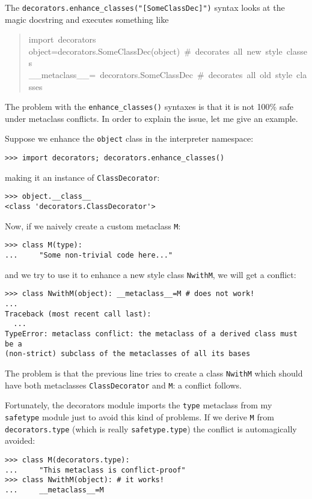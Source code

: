 \documentclass[11pt,english]{article}
\begin{document}
The \texttt{decorators.enhance{\_}classes("[SomeClassDec]")} syntax looks at the
magic docstring and executes something like
\begin{quote}
\begin{ttfamily}\begin{flushleft}
\mbox{import~decorators}\\
\mbox{object=decorators.SomeClassDec(object)~{\#}~decorates~all~new~style~classes}\\
\mbox{{\_}{\_}metaclass{\_}{\_}=~decorators.SomeClassDec~{\#}~decorates~all~old~style~classes}
\end{flushleft}\end{ttfamily}
\end{quote}

The problem with the \texttt{enhance{\_}classes()} syntaxes is that it is
not 100{\%} safe under metaclass conflicts. In order to explain the issue,
let me give an example.

Suppose we enhance the \texttt{object} class in the interpreter namespace:
\begin{verbatim}>>> import decorators; decorators.enhance_classes()\end{verbatim}

making it an instance of \texttt{ClassDecorator}:
\begin{verbatim}>>> object.__class__ 
<class 'decorators.ClassDecorator'>\end{verbatim}

Now, if we naively create a custom metaclass \texttt{M}:
\begin{verbatim}>>> class M(type): 
...     "Some non-trivial code here..." \end{verbatim}

and we try to use it to enhance a new style class \texttt{NwithM}, we will get a
conflict:
\begin{verbatim}>>> class NwithM(object): __metaclass__=M # does not work!
...
Traceback (most recent call last):
  ...
TypeError: metaclass conflict: the metaclass of a derived class must be a 
(non-strict) subclass of the metaclasses of all its bases\end{verbatim}

The problem is that the previous line tries to create a class \texttt{NwithM} 
which should have both metaclasses \texttt{ClassDecorator} and \texttt{M}: 
a conflict follows.

Fortunately, the decorators module imports the \texttt{type} metaclass from
my \texttt{safetype} module just to avoid this kind of problems. If we
derive \texttt{M} from \texttt{decorators.type} (which is really \texttt{safetype.type})
the conflict is automagically avoided:
\begin{verbatim}>>> class M(decorators.type):
...     "This metaclass is conflict-proof"
>>> class NwithM(object): # it works!
...     __metaclass__=M\end{verbatim}
\end{document}
